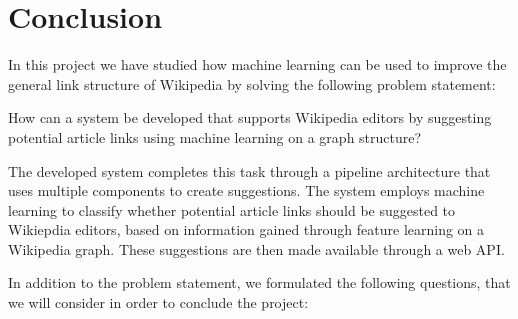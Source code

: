 \chapter{Conclusion}\label{chap:conclusion}
In this project we have studied how machine learning can be used to improve the general link structure of Wikipedia by solving the following problem statement:
\vspace{1ex} %
\begin{formal}
How can a system be developed that supports Wikipedia editors by suggesting potential article links using machine learning on a graph structure?
\end{formal}

The developed system completes this task through a pipeline architecture that uses multiple components to create suggestions. The system employs machine learning to classify whether potential article links should be suggested to Wikiepdia editors, based on information gained through feature learning on a Wikipedia graph. These suggestions are then made available through a web API.

In addition to the problem statement, we formulated the following questions, that we will consider in order to conclude the project:
\subproblems


